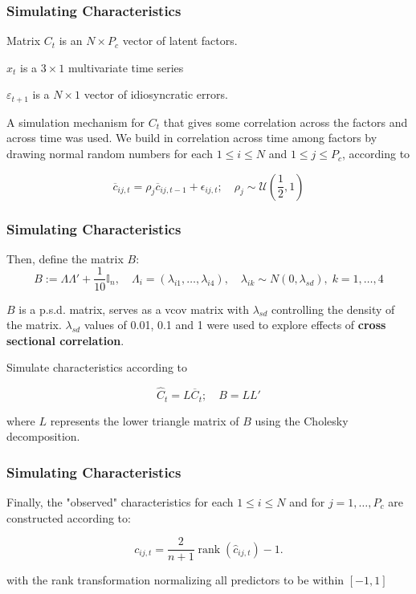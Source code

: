 \documentclass[aspectratio=169]{beamer}
\begin{document}
\begin{frame}
\frametitle{Simulating Characteristics}

Matrix $C_t$ is an $N\times P_c$ vector of latent factors. 

$x_t$ is a $3 \times 1$ multivariate time series

$\varepsilon_{t+1}$ is a $N\times 1$ vector of idiosyncratic errors. 

A simulation mechanism for $C_t$ that gives some correlation across the factors and across time was used. We build in correlation across time among factors by drawing normal random numbers for each $1\leq i\leq N$ and $1\leq j\leq P_{c}$, according to 

\begin{equation}
\overline{c}_{i j, t} = \rho_{j} \overline{c}_{i j, t-1}+\epsilon_{i j, t} ;
\quad \rho_{j} \sim \mathcal{U} \left( \frac{1}{2},1 \right) 
\end{equation}
\end{frame}

\begin{frame}
\frametitle{Simulating Characteristics}
Then, define the matrix $B$:
\begin{equation}
B:=\Lambda\Lambda' + \frac{1}{10}\mathbb{I}_{n}, \quad
\Lambda_i = (\lambda_{i1},\dots,\lambda_{i4}), \quad
\lambda_{ik}\sim N(0, \lambda_{sd}), \; k=1, \dots, 4
\end{equation}

$B$ is a p.s.d. matrix, serves as a vcov matrix with $\lambda_{sd}$ controlling the density of the matrix. $\lambda_{sd}$ values of 0.01, 0.1 and 1 were used to explore effects of \textbf{cross sectional correlation}.

Simulate characteristics according to

\begin{equation}
\widehat{C}_{t}=L\overline{C}_{t} ; \quad B = LL' 
\end{equation}

where $L$ represents the lower triangle matrix of $B$ using the Cholesky decomposition.
\end{frame}

\begin{frame}
\frametitle{Simulating Characteristics}

Finally, the "observed" characteristics for each $1\leq i\leq N$ and for $j=1, \dots, P_{c}$ are constructed according to:

\begin{equation}
c_{i j, t} = \frac{2}{n+1} \operatorname{rank}\left(\hat{c}_{i j, t}\right) - 1.
\end{equation}

with the rank transformation normalizing all predictors to be within $[-1, 1]$ 
\end{frame}
\end{document}
